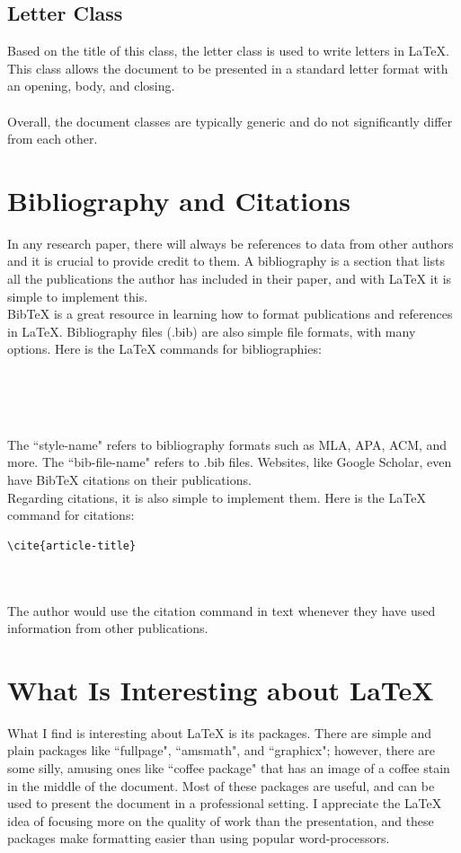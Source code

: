 \documentclass[11pt,twocolumn]{article}
\begin{document}
\subsection{Letter Class}
Based on the title of this class, the letter class is used to write letters in {\LaTeX}. This class allows the document to be presented in a standard letter format with an opening, body, and closing.
\\
\\
Overall, the document classes are typically generic and do not significantly differ from each other.

\section{Bibliography and Citations}
In any research paper, there will always be references to data from other authors and it is crucial to provide credit to them. A bibliography is a section that lists all the publications the author has included in their paper, and with {\LaTeX} it is simple to implement this.
\\
BibTeX is a great resource in learning how to format publications and references in {\LaTeX}. Bibliography files (.bib) are also simple file formats, with many options. Here is the {\LaTeX} commands for bibliographies:
\begin{verbatim}


\end{verbatim}
\\
\\
The ``style-name" refers to bibliography formats such as MLA, APA, ACM, and more. The ``bib-file-name" refers to .bib files. Websites, like Google Scholar, even have BibTeX citations on their publications.
\\
Regarding citations, it is also simple to implement them. Here is the {\LaTeX} command for citations:
\begin{verbatim}
\cite{article-title}
\end{verbatim}
\\
\\
The author would use the citation command in text whenever they have used information from other publications.
\section{What Is Interesting about {\LaTeX}}
What I find is interesting about {\LaTeX} is its packages. There are simple and plain packages like ``fullpage", ``amsmath", and ``graphicx"; however, there are some silly, amusing ones like ``coffee package" that has an image of a coffee stain in the middle of the document. Most of these packages are useful, and can be used to present the document in a professional setting. I appreciate the {\LaTeX} idea of focusing more on the quality of work than the presentation, and these packages make formatting easier than using popular word-processors.
\end{document}
